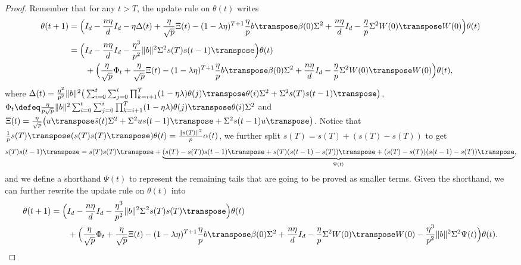 \begin{proof}
    Remember that for any $t>T$, the update rule on $\theta(t)$ writes
    \begin{align*}
        \theta(t+1) & = \Big( I_d - \frac{n\eta}{d} I_d - \eta\Delta(t) + \frac{\eta}{\sqrt p}\Xi(t)  - (1-\lambda\eta)^{T+1} \frac{\eta}{p} b\transpose\beta(0) \Sigma^2 + \frac{n\eta}{d}I_d - \frac{\eta}{p}\Sigma^2 W(0)\transpose W(0) \Big)\theta(t) \\
        & = \Big( I_d - \frac{n\eta}{d} I_d - \frac{\eta^3}{p^2} \|b\|^2 \Sigma^2 s(T) s(t-1)\transpose \Big)\theta(t) \\
        & \qquad + \Big( \frac{\eta}{\sqrt{p}} \Phi_t + \frac{\eta}{\sqrt p}\Xi(t)  - (1-\lambda\eta)^{T+1} \frac{\eta}{p} b\transpose\beta(0) \Sigma^2 + \frac{n\eta}{d}I_d - \frac{\eta}{p}\Sigma^2 W(0)\transpose W(0) \Big)\theta(t),
    \end{align*}
    where $\Delta(t) = \frac{\eta^2}{p^2} \|b\|^2\big(\sum_{i=0}^t\sum_{j=0}^i \prod_{k=i+1}^T (1-\eta\lambda)\theta(j)\transpose \theta(i) \Sigma^2 + \Sigma^2 s(T) s(t-1)\transpose \big)$, $\Phi_t \defeq \frac{\eta}{p\sqrt{p}} \|b\|^2 \sum_{i=0}^t\sum_{j=0}^i \prod_{k=i+1}^T (1-\eta\lambda)\theta(j)\transpose \theta(i) \Sigma^2$ and $\Xi(t) = \frac{\eta}{\sqrt p}\big(u\transpose \tilde{s}(t) \Sigma^2 + \Sigma^2 u s(t-1)\transpose + \Sigma^2 s(t-1)u\transpose\big)$. Notice that $\frac{1}{p} s(T)\transpose(s(T) s(T)\transpose)\theta(t) = \frac{\|s(T)\|^2}{p} \alpha(t)$, we further split $s(T) = s(T) + (s(T) - s(T))$ to get
    \begin{align*}
        s(T) s(t-1)\transpose = s(T) s(T)\transpose + \underbrace{(s(T) - s(T)) s(t-1)\transpose + s(T) (s(t-1) - s(T))\transpose + (s(T) - s(T))(s(t-1) - s(T))\transpose}_{\Psi(t)},
    \end{align*}
    and we define a shorthand $\Psi(t)$ to represent the remaining tails that are going to be proved as smaller terms. Given the shorthand, we can further rewrite the update rule on $\theta(t)$ into
    \begin{align}
        \begin{split}\label{eqn:update-split}
            \theta(t+1) & = \Big( I_d - \frac{n\eta}{d} I_d - \frac{\eta^3}{p^2} \|b\|^2 \Sigma^2 s(T) s(T)\transpose \Big)\theta(t) \\
            & \qquad + \Big( \frac{\eta}{\sqrt{p}} \Phi_t + \frac{\eta}{\sqrt p}\Xi(t)  - (1-\lambda\eta)^{T+1} \frac{\eta}{p} b\transpose\beta(0) \Sigma^2 + \frac{n\eta}{d}I_d - \frac{\eta}{p}\Sigma^2 W(0)\transpose W(0) - \frac{\eta^3}{p^2} \|b\|^2 \Sigma^2 \Psi(t) \Big)\theta(t).

\end{split}
\end{align}
\end{proof}

